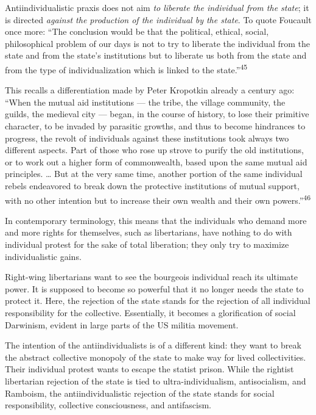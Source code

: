 Antiindividualistic praxis does not aim \textit{to liberate the individual from
the state}; it is directed \textit{against the production of the individual by
the state}. To quote Foucault once more: “The conclusion would be that the
political, ethical, social, philosophical problem of our days is not to try to
liberate the individual from the state and from the state’s institutions but to
liberate us both from the state and from the type of individualization which is
linked to the state.”\textsuperscript{45}

This recalls a differentiation made by Peter Kropotkin already a century ago:
“When the mutual aid institutions — the tribe, the village community, the
guilds, the medieval city — began, in the course of history, to lose their
primitive character, to be invaded by parasitic growths, and thus to become
hindrances to progress, the revolt of individuals against these institutions
took always two different aspects. Part of those who rose up strove to purify
the old institutions, or to work out a higher form of commonwealth, based upon
the same mutual aid principles. … But at the very same time, another portion of
the same individual rebels endeavored to break down the protective institutions
of mutual support, with no other intention but to increase their own wealth and
their own powers.”\textsuperscript{46}

In contemporary terminology, this means that the individuals who demand more and
more rights for themselves, such as libertarians, have nothing to do with
individual protest for the sake of total liberation; they only try to maximize
individualistic gains.

Right-wing libertarians want to see the bourgeois individual reach its ultimate
power. It is supposed to become so powerful that it no longer needs the state to
protect it. Here, the rejection of the state stands for the rejection of all
individual responsibility for the collective. Essentially, it becomes a
glorification of social Darwinism, evident in large parts of the US militia
movement.

The intention of the antiindividualists is of a different kind: they want to
break the abstract collective monopoly of the state to make way for lived
collectivities. Their individual protest wants to escape the statist prison.
While the rightist libertarian rejection of the state is tied to
ultra-individualism, antisocialism, and Ramboism, the antiindividualistic
rejection of the state stands for social responsibility, collective
consciousness, and antifascism.

